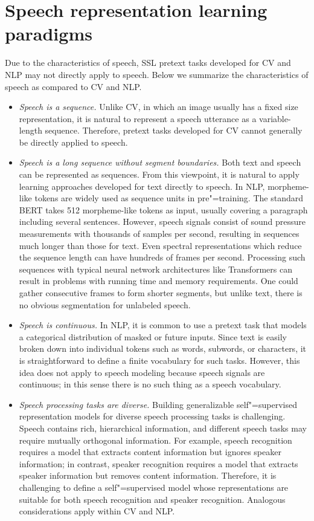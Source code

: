 
\section{Speech representation learning paradigms} \label{sec:approach}
Due to the characteristics of speech, SSL pretext tasks developed for CV
and NLP may not directly apply to speech.
Below we summarize the characteristics of speech as compared to CV and NLP.
\begin{itemize}
\item \textit{Speech is a sequence.} 
Unlike CV, in which an image usually has a fixed size representation, it is
natural to represent a speech utterance as a variable-length sequence. 
Therefore, pretext tasks developed for CV cannot generally be directly
applied to speech.

\item \textit{Speech is a long sequence without segment boundaries.} 
Both text and speech can be represented as sequences. From this viewpoint, it
is natural to apply learning approaches developed for text directly to
speech. 
In NLP, morpheme-like tokens are widely used as sequence units in
pre"=training. The standard BERT takes 512 morpheme-like tokens as
input, usually covering a paragraph including several sentences. 
However, speech signals consist of sound pressure measurements with thousands
of samples per second, resulting in sequences much longer than those for text. Even
spectral representations which reduce the sequence length can have hundreds of
frames per second.
Processing such sequences with typical neural network architectures like
Transformers can result in problems with running time and memory requirements. 
One could gather consecutive frames to form shorter segments,
but unlike text, there is no obvious segmentation for unlabeled
speech.
\item \textit{Speech is continuous.} 
In NLP, it is common to use a pretext task that models a categorical
distribution of masked or future inputs. Since text is easily broken down into
individual tokens such as words, subwords, or characters, it is
straightforward to define a finite vocabulary for such tasks.
However, this idea does not apply to speech modeling because speech
signals are continuous; 
in this sense there is no such thing as a speech vocabulary. 
\item \textit{Speech processing tasks are diverse.}
Building generalizable self"=supervised representation models for diverse speech
processing tasks is challenging. 
Speech contains rich, hierarchical information, and different speech tasks
may require mutually orthogonal information.
For example, speech recognition requires a model that extracts content information
but ignores speaker information; in contrast, speaker recognition 
requires a model that extracts speaker information but removes content information.
Therefore, it is challenging to define a self"=supervised model whose
representations are suitable for both speech recognition and speaker
recognition. Analogous considerations apply within CV and NLP.
\end{itemize}

